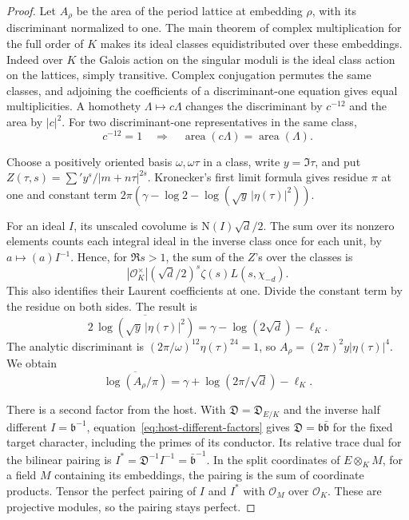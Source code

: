 \begin{proof}
Let \(A_\rho\) be the area of the period lattice at embedding
\(\rho\), with its discriminant normalized to one. The main
theorem of complex multiplication for the full order of \(K\)
makes its ideal classes equidistributed over these embeddings.
Indeed over \(K\) the Galois action on the singular moduli is
the ideal class action on the lattices, simply transitive. Complex
conjugation permutes the same classes, and adjoining the
coefficients of a discriminant-one equation gives equal
multiplicities. A homothety \(\Lambda\mapsto c\Lambda\) changes the
discriminant by \(c^{-12}\) and the area by \(|c|^2\). For two
discriminant-one representatives in the same class,
\[
 c^{-12}=1\quad\Longrightarrow\quad
 \operatorname{area}(c\Lambda)=\operatorname{area}(\Lambda).
\] \cite{cm-reciprocity}

Choose a positively oriented basis \(\omega,\omega\tau\) in a
class, write \(y=\Im\tau\), and put
\(Z(\tau,s)=\sum' y^s/|m+n\tau|^{2s}\). Kronecker's first
limit formula gives residue \(\pi\) at one and constant term
\(2\pi(\gamma-\log 2-\log(\sqrt y\,|\eta(\tau)|^2))\).

For an ideal \(I\), its unscaled covolume is
\(\mathrm{N}(I)\sqrt d/2\). The sum over its nonzero elements
counts each integral ideal in the inverse class once for each
unit, by \(a\mapsto(a)I^{-1}\). Hence, for \(\Re s>1\),
the sum of the \(Z\)'s over the classes is
\[
       |\mathcal O_K^\times|(\sqrt d/2)^s\zeta(s)L(s,\chi_{-d}).
\]
This also identifies their Laurent coefficients at one. Divide the
constant term by the residue on both sides. The result is
\[
  2\,\overline{\log(\sqrt y\,|\eta(\tau)|^2)}
       =\gamma-\log(2\sqrt d)-\ell_K .
\]
The analytic discriminant is
\((2\pi/\omega)^{12}\eta(\tau)^{24}=1\), so
\(A_\rho=(2\pi)^2y|\eta(\tau)|^4\). We obtain
\begin{equation}\label{eq:selected-curve-area}
        \overline{\log(A_\rho/\pi)}
             =\gamma+\log(2\pi/\sqrt d)-\ell_K .
\end{equation}
\cite{kronecker-period-mean}\label{cor:selected-period-means-1}

There is a second factor from the host. With
\(\mathfrak D=\mathfrak D_{E/K}\) and the inverse half different
\(I=\mathfrak b^{-1}\), equation~\eqref{eq:host-different-factors}
gives \(\mathfrak D=\mathfrak b\bar{\mathfrak b}\) for the fixed target
character, including the primes of its conductor. Its relative
trace dual for the bilinear pairing is
\(I^*=\mathfrak D^{-1}I^{-1}=\bar{\mathfrak b}^{-1}\). In the split coordinates of
\(E\otimes_K M\), for a field \(M\) containing its embeddings,
the pairing is the sum of coordinate products. Tensor the
perfect pairing of \(I\) and \(I^*\) with \(\mathcal O_M\)
over \(\mathcal O_K\). These are projective modules, so the
pairing stays perfect.


\end{proof}
